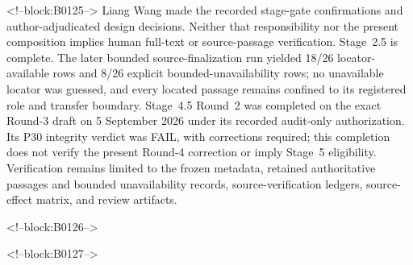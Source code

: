 \documentclass[11pt,a4paper]{article}
\begin{document}
<!--block:B0125-->
Liang Wang made the recorded stage-gate confirmations and author-adjudicated design decisions. Neither that responsibility nor the present composition implies human full-text or source-passage verification. Stage~2.5 is complete. The later bounded source-finalization run yielded 18/26 locator-available rows and 8/26 explicit bounded-unavailability rows; no unavailable locator was guessed, and every located passage remains confined to its registered role and transfer boundary. Stage~4.5 Round~2 was completed on the exact Round-3 draft on 5 September 2026 under its recorded audit-only authorization. Its P30 integrity verdict was FAIL, with corrections required; this completion does not verify the present Round-4 correction or imply Stage~5 eligibility. Verification remains limited to the frozen metadata, retained authoritative passages and bounded unavailability records, source-verification ledgers, source-effect matrix, and review artifacts.

<!--block:B0126-->



<!--block:B0127-->
\end{document}
